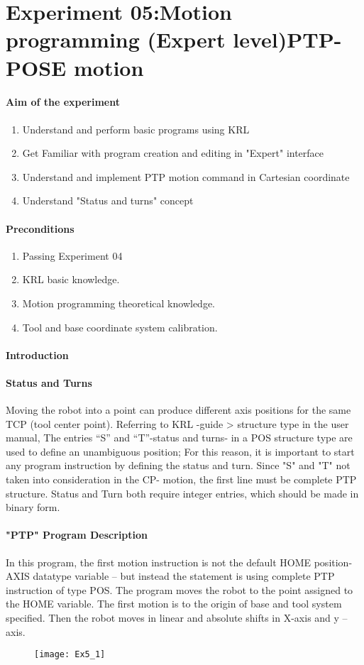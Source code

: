 \section{Experiment 05:Motion programming (Expert level)PTP-POSE motion}
\paragraph{Aim of the experiment}
\begin{enumerate}
	\item  Understand and perform basic programs using  KRL
	\item  Get Familiar with program creation and editing in "Expert" interface
	\item  Understand and implement PTP motion command in Cartesian coordinate
	\item  Understand "Status and turns" concept
\end{enumerate}
\paragraph{Preconditions}
\begin{enumerate}
	\item  Passing Experiment 04
	\item  KRL basic knowledge.
	\item  Motion programming theoretical knowledge. 
	\item Tool and base coordinate system calibration.
\end{enumerate}
\paragraph{Introduction}
\paragraph{Status and Turns}

Moving the robot into a point can produce different axis positions for the same TCP (tool center point).
Referring to KRL -guide > structure type in the user manual, The entries “S” and “T”-status and turns- in a  POS structure type are used to define an unambiguous position; For this reason, it is important to start any program instruction by defining the status and turn. Since "S" and "T" not taken into consideration in the CP- motion, the first line must be complete PTP structure.
Status and Turn both require integer entries, which should be made in binary form.
\paragraph{"PTP" Program Description}
In this program, the first motion instruction is not the default HOME position- AXIS datatype variable – but instead the statement is using complete PTP instruction of type POS.
The program moves the robot to the point assigned to the HOME variable. The first motion is to the origin of base and tool system specified. Then the robot moves in linear and absolute shifts in X-axis and y –axis.
\begin{figure}[H]
	\centering
	\texttt{[image: Ex5\_1]}
\end{figure}
